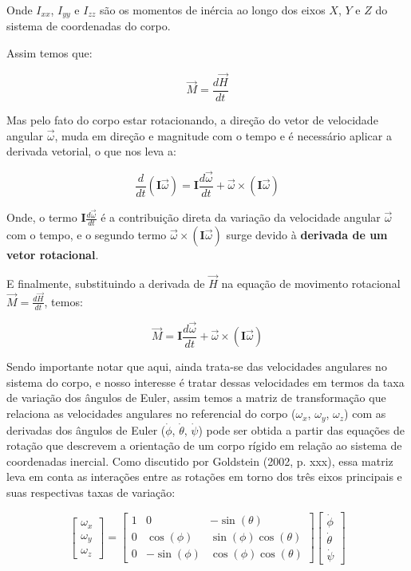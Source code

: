 Onde \( I_{xx} \), \( I_{yy} \) e \( I_{zz} \) são os momentos de inércia ao longo dos eixos \( X \), \( Y \) e \( Z \) do sistema de coordenadas do corpo. 

Assim temos que:

\[
\vec{M} = \frac{d\vec{H}}{dt}
\]

Mas pelo fato do corpo estar rotacionando, a direção do vetor de velocidade angular \(\vec{\omega}\), muda em direção e magnitude com o tempo e é necessário aplicar a derivada vetorial, o que nos leva a:

\[
\frac{d}{dt} (\mathbf{I} \vec{\omega}) = \mathbf{I} \frac{d\vec{\omega}}{dt} + \vec{\omega} \times (\mathbf{I} \vec{\omega})
\]

Onde, o termo \(\mathbf{I} \frac{d\vec{\omega}}{dt}\) é a contribuição direta da variação da velocidade angular \(\vec{\omega}\) com o tempo, e o segundo termo \(\vec{\omega} \times (\mathbf{I} \vec{\omega})\) surge devido à \textbf{derivada de um vetor rotacional}.

E finalmente, substituindo a derivada de \(\vec{H}\) na equação de movimento rotacional \(\vec{M} = \frac{d\vec{H}}{dt}\), temos:


\[
\vec{M} = \mathbf{I} \frac{d\vec{\omega}}{dt} + \vec{\omega} \times (\mathbf{I} \vec{\omega})
\]

Sendo importante notar que aqui, ainda trata-se das velocidades angulares no sistema do corpo, e nosso interesse é tratar dessas velocidades em termos da taxa de variação dos ângulos de Euler, assim temos a matriz de transformação que relaciona as velocidades angulares no referencial do corpo (\(\omega_x\), \(\omega_y\), \(\omega_z\)) com as derivadas dos ângulos de Euler (\(\dot{\phi}\), \(\dot{\theta}\), \(\dot{\psi}\)) pode ser obtida a partir das equações de rotação que descrevem a orientação de um corpo rígido em relação ao sistema de coordenadas inercial. Como discutido por Goldstein (2002, p. xxx), essa matriz leva em conta as interações entre as rotações em torno dos três eixos principais e suas respectivas taxas de variação:

\[
\begin{bmatrix}
\omega_x \\
\omega_y \\
\omega_z
\end{bmatrix}
=
\begin{bmatrix}
1 & 0 & -\sin(\theta) \\
0 & \cos(\phi) & \sin(\phi)\cos(\theta) \\
0 & -\sin(\phi) & \cos(\phi)\cos(\theta)
\end{bmatrix}
\begin{bmatrix}
\dot{\phi} \\
\dot{\theta} \\
\dot{\psi}
\end{bmatrix}
\]

